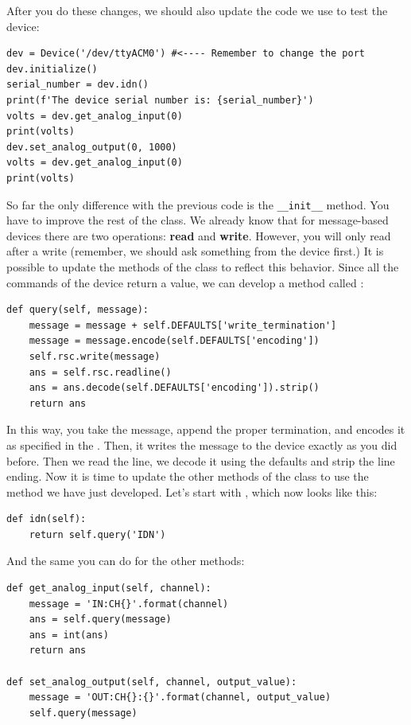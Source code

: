 After you do these changes, we should also update the code we use to test the device:

\begin{verbatim}
dev = Device('/dev/ttyACM0') #<---- Remember to change the port
dev.initialize()
serial_number = dev.idn()
print(f'The device serial number is: {serial_number}')
volts = dev.get_analog_input(0)
print(volts)
dev.set_analog_output(0, 1000)
volts = dev.get_analog_input(0)
print(volts)
\end{verbatim}

\sloppy So far the only difference with the previous code is the \texttt{__init__} method. You have to improve the rest of the class. We already know that for message-based devices there are two operations: \textbf{read} and \textbf{write}. However, you will only read after a write (remember, we should ask something from the device first.) It is possible to update the methods of the class to reflect this behavior. Since all the commands of the device return a value, we can develop a method called :

\begin{verbatim}
def query(self, message):
    message = message + self.DEFAULTS['write_termination']
    message = message.encode(self.DEFAULTS['encoding'])
    self.rsc.write(message)
    ans = self.rsc.readline()
    ans = ans.decode(self.DEFAULTS['encoding']).strip()
    return ans
\end{verbatim}

In this way, you take the message, append the proper termination, and encodes it as specified in the . Then, it writes the message to the
device exactly as you did before. Then we read the line, we decode it using the defaults and strip the line ending. Now it is time to update the other methods of the class to use the  method we have just developed. Let's start with , which now looks like this:

\begin{verbatim}
def idn(self):
    return self.query('IDN')
\end{verbatim}

And the same you can do for the other methods:

\begin{verbatim}
def get_analog_input(self, channel):
    message = 'IN:CH{}'.format(channel)
    ans = self.query(message)
    ans = int(ans)
    return ans

def set_analog_output(self, channel, output_value):
    message = 'OUT:CH{}:{}'.format(channel, output_value)
    self.query(message)
\end{verbatim}

